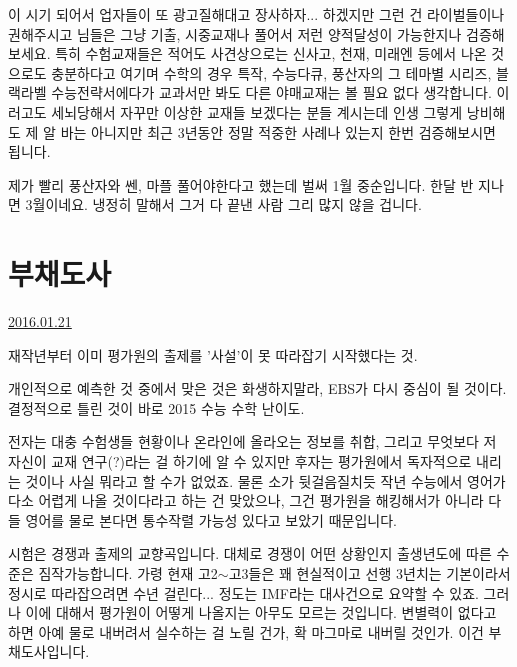 이 시기 되어서 업자들이 또 광고질해대고 장사하자... 하겠지만
그런 건 라이벌들이나 권해주시고 님들은 그냥 기출, 시중교재나 풀어서 저런 양적달성이 가능한지나 검증해보세요.
특히 수험교재들은 적어도 사견상으로는 신사고, 천재, 미래엔 등에서 나온 것으로도 충분하다고 여기며
수학의 경우 특작, 수능다큐, 풍산자의 그 테마별 시리즈, 블랙라벨 수능전략서에다가 교과서만 봐도 다른 야매교재는 볼 필요 없다 생각합니다.
이러고도 세뇌당해서 자꾸만 이상한 교재들 보겠다는 분들 계시는데 인생 그렇게 낭비해도 제 알 바는 아니지만
최근 3년동안 정말 적중한 사례나 있는지 한번 검증해보시면 됩니다.
\vspace{5mm}

제가 빨리 풍산자와 쎈, 마플 풀어야한다고 했는데 벌써 1월 중순입니다. 한달 반 지나면 3월이네요.
냉정히 말해서 그거 다 끝낸 사람 그리 많지 않을 겁니다.
\vspace{5mm}








\section{부채도사}
\href{https://www.kockoc.com/Apoc/603292}{2016.01.21}

\vspace{5mm}

재작년부터 이미 평가원의 출제를 '사설'이 못 따라잡기 시작했다는 것.
\vspace{5mm}

개인적으로 예측한 것 중에서 맞은 것은 화생하지말라, EBS가 다시 중심이 될 것이다.
결정적으로 틀린 것이 바로 2015 수능 수학 난이도.
\vspace{5mm}

전자는 대충 수험생들 현황이나 온라인에 올라오는 정보를 취합, 그리고 무엇보다 저 자신이 교재 연구(?)라는 걸 하기에 알 수 있지만
후자는 평가원에서 독자적으로 내리는 것이나 사실 뭐라고 할 수가 없었죠.
물론 소가 뒷걸음질치듯 작년 수능에서 영어가 다소 어렵게 나올 것이다라고 하는 건 맞았으나,
그건 평가원을 해킹해서가 아니라 다들 영어를 물로 본다면 통수작렬 가능성 있다고 보았기 때문입니다.
\vspace{5mm}

시험은 경쟁과 출제의 교향곡입니다.
대체로 경쟁이 어떤 상황인지 출생년도에 따른 수준은 짐작가능합니다.
가령 현재 고2$\sim$고3들은 꽤 현실적이고 선행 3년치는 기본이라서 정시로 따라잡으려면 수년 걸린다... 정도는 IMF라는 대사건으로 요약할 수 있죠.
그러나 이에 대해서 평가원이 어떻게 나올지는 아무도 모르는 것입니다.
변별력이 없다고 하면 아예 물로 내버려서 실수하는 걸 노릴 건가, 확 마그마로 내버릴 것인가. 이건 부채도사입니다.
\vspace{5mm}

